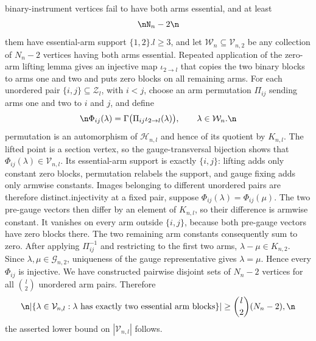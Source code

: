 binary-instrument vertices fail to have both arms essential, and at least\n\[\nN_n-2\n\]\nof them have essential-arm support \(\{1,2\}\).\n\nFix \(l\ge3\), and let \(\mathcal W_n\subseteq\mathcal V_{n,2}\) be any collection of \(N_n-2\) vertices having both arms essential. Repeated application of the zero-arm lifting lemma gives an injective map \(\iota_{2\to l}\) that copies the two binary blocks to arms one and two and puts zero blocks on all remaining arms. For each unordered pair \(\{i,j\}\subseteq\mathcal Z_l\), with \(i<j\), choose an arm permutation \(\Pi_{ij}\) sending arms one and two to \(i\) and \(j\), and define\n\[\n\Phi_{ij}(\lambda)=\Gamma\bigl(\Pi_{ij}\iota_{2\to l}(\lambda)\bigr),\qquad \lambda\in\mathcal W_n.\n\]\nArm permutation is an automorphism of \(\mathcal H_{n,l}\) and hence of its quotient by \(K_{n,l}\). The lifted point is a section vertex, so the gauge-transversal bijection shows that \(\Phi_{ij}(\lambda)\in\mathcal V_{n,l}\). Its essential-arm support is exactly \(\{i,j\}\): lifting adds only constant zero blocks, permutation relabels the support, and gauge fixing adds only armwise constants. Images belonging to different unordered pairs are therefore distinct.\n\nFor injectivity at a fixed pair, suppose \(\Phi_{ij}(\lambda)=\Phi_{ij}(\mu)\). The two pre-gauge vectors then differ by an element of \(K_{n,l}\), so their difference is armwise constant. It vanishes on every arm outside \(\{i,j\}\), because both pre-gauge vectors have zero blocks there. The two remaining arm constants consequently sum to zero. After applying \(\Pi_{ij}^{-1}\) and restricting to the first two arms, \(\lambda-\mu\in K_{n,2}\). Since \(\lambda,\mu\in\mathcal G_{n,2}\), uniqueness of the gauge representative gives \(\lambda=\mu\). Hence every \(\Phi_{ij}\) is injective. We have constructed pairwise disjoint sets of \(N_n-2\) vertices for all \(\binom l2\) unordered arm pairs. Therefore\n\[\n|\{\lambda\in\mathcal V_{n,l}:\lambda\text{ has exactly two essential arm blocks}\}|\ge\binom l2(N_n-2),\n\]\nand the asserted lower bound on \(|\mathcal V_{n,l}|\) follows.